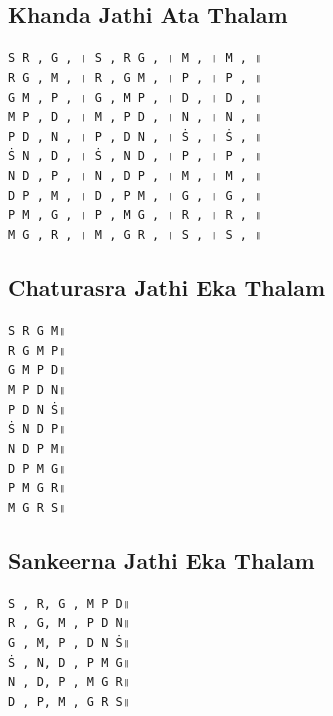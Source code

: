 \documentclass[12pt]{article}
\newcommand{\df}[1]{{\devanagarifont#1}}
\begin{document}
\subsection{Khanda Jathi Ata Thalam}
\texttt{S~R~\df{,}~G~\df{,}~\df{।}~S~\df{,}~R~G~\df{,}~\df{।}~M~\df{,}~\df{।}~M~\df{,}~\df{॥}}\\
\texttt{R~G~\df{,}~M~\df{,}~\df{।}~R~\df{,}~G~M~\df{,}~\df{।}~P~\df{,}~\df{।}~P~\df{,}~\df{॥}}\\
\texttt{G~M~\df{,}~P~\df{,}~\df{।}~G~\df{,}~M~P~\df{,}~\df{।}~D~\df{,}~\df{।}~D~\df{,}~\df{॥}}\\
\texttt{M~P~\df{,}~D~\df{,}~\df{।}~M~\df{,}~P~D~\df{,}~\df{।}~N~\df{,}~\df{।}~N~\df{,}~\df{॥}}\\
\texttt{P~D~\df{,}~N~\df{,}~\df{।}~P~\df{,}~D~N~\df{,}~\df{।}~Ṡ~\df{,}~\df{।}~Ṡ~\df{,}~\df{॥}}\\
\texttt{Ṡ~N~\df{,}~D~\df{,}~\df{।}~Ṡ~\df{,}~N~D~\df{,}~\df{।}~P~\df{,}~\df{।}~P~\df{,}~\df{॥}}\\
\texttt{N~D~\df{,}~P~\df{,}~\df{।}~N~\df{,}~D~P~\df{,}~\df{।}~M~\df{,}~\df{।}~M~\df{,}~\df{॥}}\\
\texttt{D~P~\df{,}~M~\df{,}~\df{।}~D~\df{,}~P~M~\df{,}~\df{।}~G~\df{,}~\df{।}~G~\df{,}~\df{॥}}\\
\texttt{P~M~\df{,}~G~\df{,}~\df{।}~P~\df{,}~M~G~\df{,}~\df{।}~R~\df{,}~\df{।}~R~\df{,}~\df{॥}}\\
\texttt{M~G~\df{,}~R~\df{,}~\df{।}~M~\df{,}~G~R~\df{,}~\df{।}~S~\df{,}~\df{।}~S~\df{,}~\df{॥}}\\
\newpage
\subsection{Chaturasra Jathi Eka Thalam}
\texttt{S~R~G~M\df{॥}}\\
\texttt{R~G~M~P\df{॥}}\\
\texttt{G~M~P~D\df{॥}}\\
\texttt{M~P~D~N\df{॥}}\\
\texttt{P~D~N~Ṡ\df{॥}}\\
\texttt{Ṡ~N~D~P\df{॥}}\\
\texttt{N~D~P~M\df{॥}}\\
\texttt{D~P~M~G\df{॥}}\\
\texttt{P~M~G~R\df{॥}}\\
\texttt{M~G~R~S\df{॥}}\\
\subsection{Sankeerna Jathi Eka Thalam}
\texttt{S~\df{,}~R\df{,}~G~\df{,}~M~P~D\df{॥}}\\
\texttt{R~\df{,}~G\df{,}~M~\df{,}~P~D~N\df{॥}}\\
\texttt{G~\df{,}~M\df{,}~P~\df{,}~D~N~Ṡ\df{॥}}\\
\texttt{Ṡ~\df{,}~N\df{,}~D~\df{,}~P~M~G\df{॥}}\\
\texttt{N~\df{,}~D\df{,}~P~\df{,}~M~G~R\df{॥}}\\
\texttt{D~\df{,}~P\df{,}~M~\df{,}~G~R~S\df{॥}}\\
\end{document}
